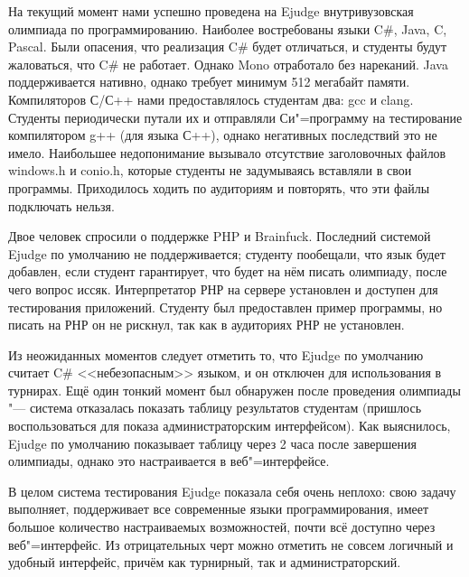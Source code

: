 \documentclass[10pt, a5paper]{article}
\begin{document}
На текущий момент нами успешно проведена на Ejudge внутривузовская олимпиада по программированию. Наиболее востребованы языки C\#, Java, C, Pascal. Были опасения, что реализация  C\# будет отличаться, и студенты будут жаловаться, что C\# не работает. Однако Mono отработало без нареканий. Java поддерживается нативно, однако требует минимум 512 мегабайт памяти. Компиляторов С/С++ нами предоставлялось студентам два: gcc и clang. Студенты периодически путали их и отправляли Си"=программу на тестирование компилятором g++ (для языка С++), однако негативных последствий это не имело. Наибольшее недопонимание вызывало отсутствие заголовочных файлов windows.h и conio.h, которые студенты не задумываясь вставляли в свои программы. Приходилось ходить по аудиториям и повторять, что эти файлы подключать нельзя. 

Двое человек спросили о поддержке PHP и Brainfuck. Последний системой Ejudge по умолчанию не поддерживается; студенту пообещали, что язык будет добавлен, если студент гарантирует, что будет на нём писать олимпиаду, после чего вопрос иссяк. Интерпретатор РНР на сервере установлен и доступен для тестирования приложений. Студенту был предоставлен пример программы, но писать на РНР он не рискнул, так как в аудиториях РНР не установлен. 

Из неожиданных моментов следует отметить то, что Ejudge по умолчанию считает C\# <<небезопасным>> языком, и он отключен для использования в турнирах. Ещё один тонкий момент был обнаружен после проведения олимпиады "--- система отказалась показать таблицу результатов студентам (пришлось воспользоваться для показа администраторским интерфейсом). Как выяснилось, Ejudge по умолчанию показывает таблицу через 2 часа после завершения олимпиады, однако это настраивается в веб"=интерфейсе.

В целом система тестирования Ejudge показала себя очень неплохо: свою задачу выполняет, поддерживает все современные языки программирования, имеет большое количество настраиваемых возможностей, почти всё доступно через веб"=интерфейс. Из отрицательных черт можно отметить не совсем логичный и удобный интерфейс, причём как турнирный, так и администраторский.
\end{document}
